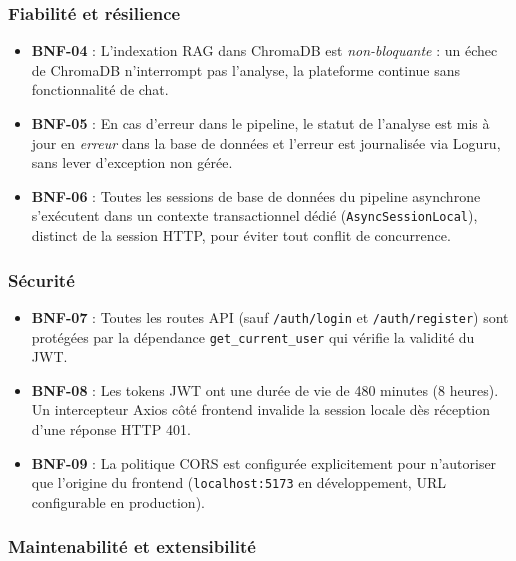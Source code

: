 \documentclass[a4paper,12pt,oneside]{report}
\begin{document}
	\subsubsection*{Fiabilité et résilience}
	
	\begin{itemize}
		\item \textbf{BNF-04} : L'indexation RAG dans ChromaDB est
		\textit{non-bloquante} : un échec de ChromaDB n'interrompt pas
		l'analyse, la plateforme continue sans fonctionnalité de chat.
		\item \textbf{BNF-05} : En cas d'erreur dans le pipeline, le statut
		de l'analyse est mis à jour en \textit{erreur} dans la base de
		données et l'erreur est journalisée via Loguru, sans lever
		d'exception non gérée.
		\item \textbf{BNF-06} : Toutes les sessions de base de données du
		pipeline asynchrone s'exécutent dans un contexte transactionnel
		dédié (\texttt{AsyncSessionLocal}), distinct de la session HTTP,
		pour éviter tout conflit de concurrence.
	\end{itemize}
	
	\subsubsection*{Sécurité}
	
	\begin{itemize}
		\item \textbf{BNF-07} : Toutes les routes API (sauf \texttt{/auth/login}
		et \texttt{/auth/register}) sont protégées par la dépendance
		\texttt{get\_current\_user} qui vérifie la validité du JWT.
		\item \textbf{BNF-08} : Les tokens JWT ont une durée de vie de 480
		minutes (8 heures). Un intercepteur Axios côté frontend invalide la
		session locale dès réception d'une réponse HTTP 401.
		\item \textbf{BNF-09} : La politique CORS est configurée explicitement
		pour n'autoriser que l'origine du frontend (\texttt{localhost:5173}
		en développement, URL configurable en production).
	\end{itemize}
	
	\subsubsection*{Maintenabilité et extensibilité}
	
\end{document}
